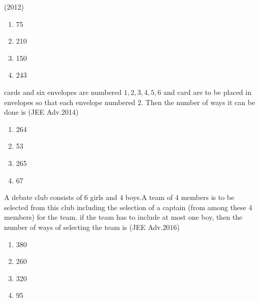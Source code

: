 \hfill{(2012)}\\
\begin{multicols}{2} 
\begin{enumerate}
\item  75\item 210\columnbreak\item150\item 243
\end{enumerate}
\end{multicols}
\item cards and six envelopes are numbered $1,2,3,4,5,6$ and card are to be placed in envelopes so that each envelope numbered $2$. Then the number of ways it can be done is
\hspace*{\fill}(JEE Adv.2014)\\
\begin{multicols}{2} 
\begin{enumerate}
\item  264\item53 \columnbreak \item 265\item  67
\end{enumerate}
\end{multicols}
\item A debate club consists of $6$ girls and $4$ boys.A team of $4$ members is to be selected from this club including the selection of a captain (from among these 4 members) for the team. if the team has to include at most one boy, then the number of ways of selecting the team is
\hfill{(JEE Adv.$2016$)}\\
\begin{multicols}{2} 
\begin{enumerate}
\item  380\item 260\columnbreak\item 320\item  95
\end{enumerate}
\end{multicols}
